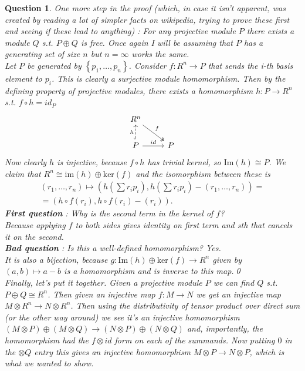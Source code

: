 \documentclass[a4paper]{article}
\newtheorem{que}[thm]{Question}
\begin{document}
\begin{que}
    One more step in the proof (which, in case it isn't apparent, was created by reading a lot of simpler facts on wikipedia, trying to prove these first and seeing if these lead to anything) : For any projective module $P$ there exists a module $Q$ s.t. $P\oplus Q$ is free. Once again I will be assuming that $P$ has a generating set of size $n$ but $n=\infty$ works the same.\\
    Let  $P$ be generated by  $\left\{ p_1, \ldots, p_n \right\} $. Consider $f:R^{n}\to P$ that sends the i-th basis element to $p_i$. This is clearly a surjective module homomorphism. Then by the defining property of projective modules, there exists a homomorphism  $h:P\to R^{n}$ s.t. $f\circ h=id_P$
    \[
    \begin{tikzcd}
        R^{n}\arrow[rd,two heads,"f"]\\
        P\arrow[r,"id"]\arrow[u,dashed,hook,"h"] & P
    \end{tikzcd}
   \] 
   Now clearly $h$ is injective, because $f\circ h$ has trivial kernel, so  $\text{Im}(h) \cong P$. We claim that  $R^{n}\cong \text{im}\left( h \right) \oplus \text{ker}\left( f \right) $ and the isomorphism between these is \begin{align*}
       \left( r_1, \ldots, r_n \right)\mapsto \left( h\left( \sum r_i p_i \right),h\left( \sum r_i p_i \right)- \left( r_1, \ldots, r_n \right)  \right)=\\ =\left( h\circ f\left( r_i\right), h\circ f\left( r_i \right)-\left( r_i \right)    \right) 
   .
   \end{align*}
   \textbf{First question} : Why is the second term in the kernel of $f$? \\Because applying $f$ to both sides gives identity on first term and sth that cancels it on the second.\\
   \textbf{Bad question} : Is this a well-defined homomorphism? Yes.\\
   It is also a bijection, because $g : \text{Im}(h) \oplus \text{ker}(f) \to R^n$ given by $(a,b) \mapsto 
   a-b$ is a homomorphism and is inverse to this map.\qed \\
Finally, let's put it together. Given a projective module $P$ we can find $Q$ s.t. $P\oplus Q\cong R^{n}$. Then given an injective map $f:M\to N$ we get an injective map $M\otimes R^{n}\to N\otimes R^{n}$. Then using the distributivity of tensor product over direct sum (or the other way around) we see it's an injective homomorphism $\left( M\otimes P \right) \oplus \left( M\otimes Q \right) \to \left( N\otimes P \right) \oplus \left( N\otimes Q \right) $ and, importantly, the homomorphism had the $f\otimes id$ form on each of the summands. Now putting $0$ in the $\otimes Q$ entry this gives an injective homomorphism $M\otimes P\to N\otimes P$, which is what we wanted to show.
\end{que}
\end{document}
